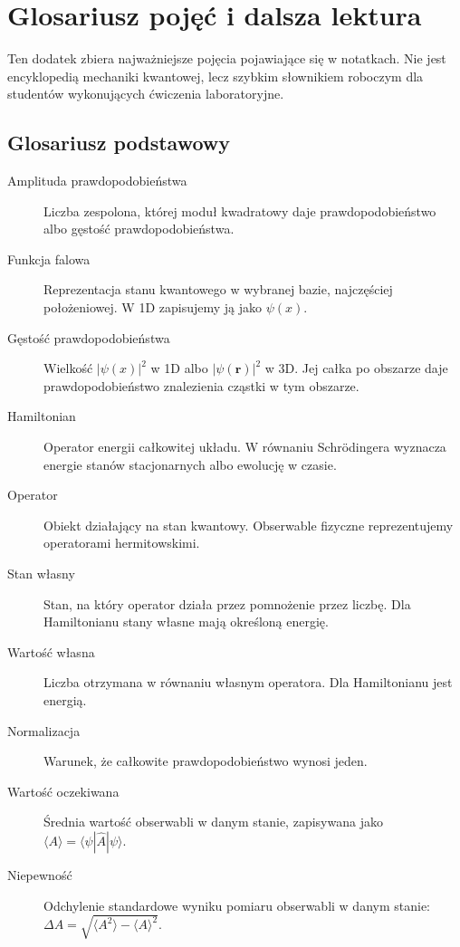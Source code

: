\chapter{Glosariusz pojęć i dalsza lektura}

\begin{summarybox}
Ten dodatek zbiera najważniejsze pojęcia pojawiające się w notatkach. Nie jest
encyklopedią mechaniki kwantowej, lecz szybkim słownikiem roboczym dla studentów
wykonujących ćwiczenia laboratoryjne.
\end{summarybox}

\section{Glosariusz podstawowy}

\begin{description}
    \item[Amplituda prawdopodobieństwa] Liczba zespolona, której moduł kwadratowy daje prawdopodobieństwo albo gęstość prawdopodobieństwa.
    \item[Funkcja falowa] Reprezentacja stanu kwantowego w wybranej bazie, najczęściej położeniowej. W 1D zapisujemy ją jako \(\psi(x)\).
    \item[Gęstość prawdopodobieństwa] Wielkość \(|\psi(x)|^2\) w 1D albo \(|\psi(\mathbf{r})|^2\) w 3D. Jej całka po obszarze daje prawdopodobieństwo znalezienia cząstki w tym obszarze.
    \item[Hamiltonian] Operator energii całkowitej układu. W równaniu Schrödingera wyznacza energie stanów stacjonarnych albo ewolucję w czasie.
    \item[Operator] Obiekt działający na stan kwantowy. Obserwable fizyczne reprezentujemy operatorami hermitowskimi.
    \item[Stan własny] Stan, na który operator działa przez pomnożenie przez liczbę. Dla Hamiltonianu stany własne mają określoną energię.
    \item[Wartość własna] Liczba otrzymana w równaniu własnym operatora. Dla Hamiltonianu jest energią.
    \item[Normalizacja] Warunek, że całkowite prawdopodobieństwo wynosi jeden.
    \item[Wartość oczekiwana] Średnia wartość obserwabli w danym stanie, zapisywana jako \(\langle A\rangle=\langle\psi|\hat{A}|\psi\rangle\).
    \item[Niepewność] Odchylenie standardowe wyniku pomiaru obserwabli w danym stanie: \(\Delta A=\sqrt{\langle A^2\rangle-\langle A\rangle^2}\).

\end{description}
